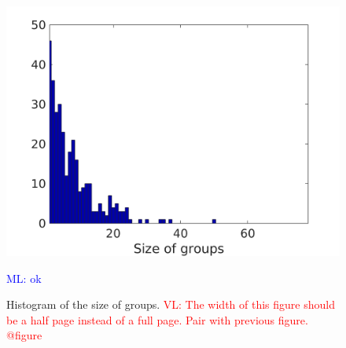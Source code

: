 \documentclass{bmcart}
\newcommand{\ml}[1]{\textcolor{blue}{ML: #1}}
\newcommand{\vl}[1]{\textcolor{red}{VL: #1}}
\begin{document}
\begin{backmatter}
\begin{figure}
\center
\includegraphics[width = \textwidth]{figures/sbc.png}
\caption{Histogram of the size of groups.
\vl{The width of this figure should be a half page instead of a full page. Pair with previous figure. @figure}}
\ml{ok}
\label{fig:xp2sizeGroup}
\end{figure}










\end{backmatter}
\end{document}
